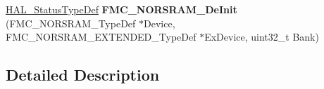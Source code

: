 \begin{DoxyCompactItemize}
\item 
\hyperlink{stm32f4xx__hal__def_8h_a63c0679d1cb8b8c684fbb0632743478f}{H\+A\+L\+\_\+\+Status\+Type\+Def} {\bfseries F\+M\+C\+\_\+\+N\+O\+R\+S\+R\+A\+M\+\_\+\+De\+Init} (F\+M\+C\+\_\+\+N\+O\+R\+S\+R\+A\+M\+\_\+\+Type\+Def $\ast$Device, F\+M\+C\+\_\+\+N\+O\+R\+S\+R\+A\+M\+\_\+\+E\+X\+T\+E\+N\+D\+E\+D\+\_\+\+Type\+Def $\ast$Ex\+Device, uint32\+\_\+t Bank)\hypertarget{group___f_m_c___l_l___n_o_r_s_r_a_m___private___functions___group1_ga5bdfef91b866a10a7c91385018db5618}{}\label{group___f_m_c___l_l___n_o_r_s_r_a_m___private___functions___group1_ga5bdfef91b866a10a7c91385018db5618}

\end{DoxyCompactItemize}


\subsection{Detailed Description}
